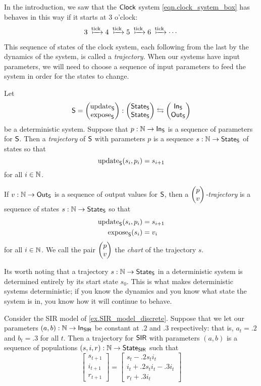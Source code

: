 \documentclass[DynamicalBook]{subfiles}
\begin{document}
{In the introduction, we saw that the $\mathsf{Clock}$ system
\cref{eqn.clock_system_box} has behaves in this way if it starts at $3$ o'clock: 
$$3 \xmapsto{\fun{tick}} 4 \xmapsto{\fun{tick}} 5 \xmapsto{\fun{tick}} 6
\xmapsto{\fun{tick}} \cdots$$

This sequence of states of the clock system, each following from the last by the
dynamics of the system, is called a \emph{trajectory}. When our systems have
input parameters, we will need to choose a sequence of input parameters to feed
the system in order for the states to change.

\begin{definition}\label{def.trajectory_discrete}
 Let $$\mathsf{S} = \begin{pmatrix}{\mathrm{update}_{\mathsf{S}}} \\ {\mathrm{expose}_{\mathsf{S}}} \end{pmatrix} : \begin{pmatrix}{\mathsf{State}_{\mathsf{S}}} \\ {\mathsf{State}_{\mathsf{S}}} \end{pmatrix}
 \leftrightarrows \begin{pmatrix}{\mathsf{In}_{\mathsf{S}}} \\ {\mathsf{Out}_{\mathsf{S}}} \end{pmatrix}$$
 be a deterministic system. Suppose that $p : \mathbb{N} \to \mathsf{In}_{\mathsf{S}}$ is a sequence of
 parameters for $\mathsf{S}$. Then a \emph{trajectory} of $\mathsf{S}$ with parameters
 $p$ is a sequence $s : \mathbb{N} \to \mathsf{State}_{\mathsf{S}}$ of states so that
 $$\mathrm{update}_{\mathsf{S}}(s_i, p_i) = s_{i + 1}$$
 for all $i \in \mathbb{N}$.

 If $v : \mathbb{N} \to \mathsf{Out}_{\mathsf{S}}$ is a sequence of output values for $\mathsf{S}$, then a
 \emph{$\begin{pmatrix}{p} \\ {v} \end{pmatrix}$-trajectory} is a sequence of states $s : \mathbb{N} \to \mathsf{State}_{\mathsf{S}}$ so
 that
 \begin{align*}
   \mathrm{update}_{\mathsf{S}}(s_i, p_i) &= s_{i + 1}\\
   \mathrm{expose}_{\mathsf{S}}(s_i) &= v_i
 \end{align*}
 for all $i \in \mathbb{N}$. We call the pair $\begin{pmatrix}{p} \\ {v} \end{pmatrix}$ the \emph{chart} of the trajectory $s$.
\end{definition}

Its worth noting that a trajectory $s : \mathbb{N} \to \mathsf{State}_{\mathsf{S}}$ in a deterministic system is determined
entirely by its start state $s_0$. This is what makes deterministic systems
deterministic; if you know the dynamics and you know what state the system is
in, you know how it will continue to behave. 

\begin{example}
Consider the SIR model of \cref{ex.SIR_model_discrete}. Suppose that we let our
parameters $(a, b) : \mathbb{N} \to \mathsf{In}_{\mathsf{\mathsf{SIR}}}$ be constant at $.2$ and $.3$
respectively: that is, $a_t = .2$ and $
b_t = .3$ for all $t$. Then a trajectory for $\mathsf{SIR}$ with parameters $(a, b)$
is a sequence of populations $(s, i, r) : \mathbb{N} \to \mathsf{State}_{\mathsf{SIR}}$ such that
$$\begin{bmatrix}s_{t+1}\\ i_{t+1}\\ r_{t+1} \end{bmatrix} = \begin{bmatrix}
  s_t - .2s_t i_t\\ i_t + .2s_t i_t - .3i_t \\ r_t + .3i_t\end{bmatrix}$$


\end{example}}
\end{document}
